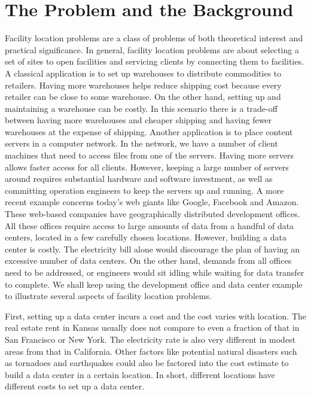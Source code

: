 \documentclass[oneside,final]{ucr}
\begin{document}
\section{The Problem and the Background}
Facility location problems are a class of problems of both
theoretical interest and practical significance. In general,
facility location problems are about selecting a set of
sites to open facilities and servicing clients by connecting
them to facilities. A classical application is to set up
warehouses to distribute commodities to retailers.  Having
more warehouses helps reduce shipping cost because every
retailer can be close to some warehouse. On the other hand,
setting up and maintaining a warehouse can be costly. In
this scenario there is a trade-off between having more
warehouses and cheaper shipping and having fewer warehouses
at the expense of shipping. Another application is to place
content servers in a computer network. In the network, we
have a number of client machines that need to access files
from one of the servers. Having more servers allows faster
access for all clients. However, keeping a large number of
servers around requires substantial hardware and software
investment, as well as committing operation engineers to
keep the servers up and running. A more recent example
concerns today's web giants like Google, Facebook and
Amazon. These web-based companies have geographically
distributed development offices. All these offices require
access to large amounts of data from a handful of data
centers, located in a few carefully chosen
locations. However, building a data center is costly. The
electricity bill alone would discourage the plan of having
an excessive number of data centers. On the other hand,
demands from all offices need to be addressed, or engineers
would sit idling while waiting for data transfer to
complete. We shall keep using the development office and
data center example to illustrate several aspects of
facility location problems.

First, setting up a data center incurs a cost and the cost
varies with location. The real estate rent in Kansas usually
does not compare to even a fraction of that in San Francisco
or New York. The electricity rate is also very different in
modest areas from that in California. Other factors like
potential natural disasters such as tornadoes and
earthquakes could also be factored into the cost estimate to
build a data center in a certain location. In short,
different locations have different costs to set up a data
center.
\end{document}
